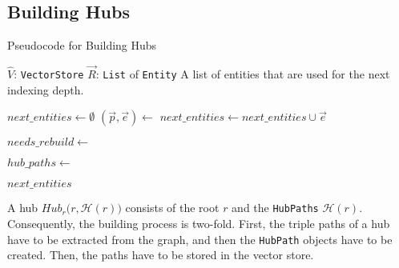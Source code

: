 \subsection{Building Hubs}
\label{sec:hublink_building_hubs}

\begin{algorithm}
\caption{Pseudocode for Building Hubs}
\label{alg:building_hubs}
\begin{algorithmic}[1]
\PersistentState
    \Statex $\hat{V}$: \texttt{VectorStore} 
\Require 
    \Statex $\vec{R}$: \texttt{List} of \texttt{Entity} 
\Ensure
    \Statex A list of entities that are used for the next indexing depth.

\Statex
{}
    \State $next\_entities \gets \emptyset$ 
        \State $(\vec{p}, \vec{e}) \gets$ 
        \State $next\_entities \gets next\_entities \cup \vec{e}$
        
        \State $needs\_rebuild \gets$ 
        
            \State $hub\_paths \gets$ 
            \State {}
        \EndIf
    
    \EndFor
    \State \Return $next\_entities$
\EndFunction
\end{algorithmic}
\end{algorithm}

A hub $Hub_r \bigl(r, \mathcal{H}(r) \bigr)$ consists of the root $r$ and the \texttt{HubPaths} $\mathcal{H}(r)$. Consequently, the building process is two-fold. First, the triple paths of a hub have to be extracted from the graph, and then the \texttt{HubPath} objects have to be created. Then, the paths have to be stored in the vector store.

